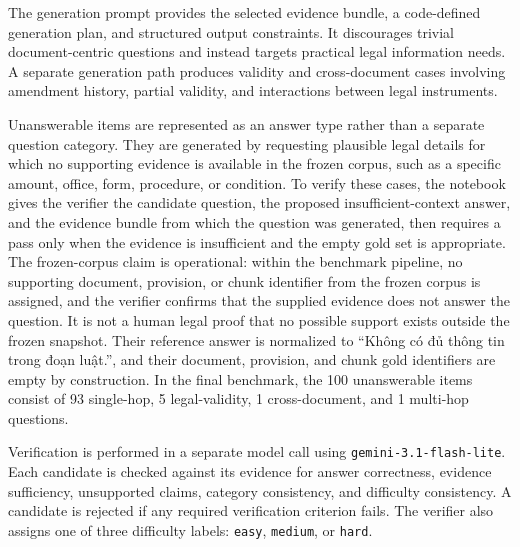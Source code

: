The generation prompt provides the selected evidence bundle, a code-defined generation plan, and structured output constraints. It discourages trivial document-centric questions and instead targets practical legal information needs. A separate generation path produces validity and cross-document cases involving amendment history, partial validity, and interactions between legal instruments.

Unanswerable items are represented as an answer type rather than a separate question category. They are generated by requesting plausible legal details for which no supporting evidence is available in the frozen corpus, such as a specific amount, office, form, procedure, or condition. To verify these cases, the notebook gives the verifier the candidate question, the proposed insufficient-context answer, and the evidence bundle from which the question was generated, then requires a pass only when the evidence is insufficient and the empty gold set is appropriate. The frozen-corpus claim is operational: within the benchmark pipeline, no supporting document, provision, or chunk identifier from the frozen corpus is assigned, and the verifier confirms that the supplied evidence does not answer the question. It is not a human legal proof that no possible support exists outside the frozen snapshot. Their reference answer is normalized to ``Không có đủ thông tin trong đoạn luật.'', and their document, provision, and chunk gold identifiers are empty by construction. In the final benchmark, the 100 unanswerable items consist of 93 single-hop, 5 legal-validity, 1 cross-document, and 1 multi-hop questions.

Verification is performed in a separate model call using \texttt{gemini-3.1-flash-lite}. Each candidate is checked against its evidence for answer correctness, evidence sufficiency, unsupported claims, category consistency, and difficulty consistency. A candidate is rejected if any required verification criterion fails. The verifier also assigns one of three difficulty labels: \texttt{easy}, \texttt{medium}, or \texttt{hard}.

